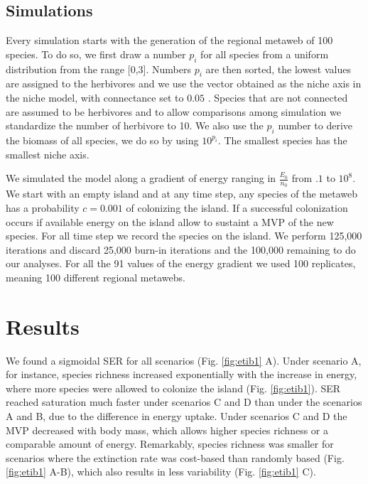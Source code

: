 \subsection{Simulations}\label{simulations}

Every simulation starts with the generation of the regional metaweb of
100 species. To do so, we first draw a number \(p_i\) for all species
from a uniform distribution from the range {[}0,3{]}. Numbers \(p_i\)
are then sorted, the lowest values are assigned to the herbivores and we
use the vector obtained as the niche axis in the niche model, with
connectance set to \(0.05\) \citep{Williams2000}. Species that are not
connected are assumed to be herbivores and to allow comparisons among
simulation we standardize the number of herbivore to 10. We also use the
\(p_i\) number to derive the biomass of all species, we do so by using
\(10^{p_i}\). The smallest species has the smallest niche axis.

We simulated the model along a gradient of energy ranging in
\(\frac{E_0}{n_0}\) from \(.1\) to \(10^8\). We start with an empty
island and at any time step, any species of the metaweb has a
probability \(c=0.001\) of colonizing the island. If a successful
colonization occurs if available energy on the island allow to sustaint
a MVP of the new species. For all time step we record the species on the
island. We perform 125,000 iterations and discard 25,000 burn-in
iterations and the 100,000 remaining to do our analyses. For all the 91
values of the energy gradient we used 100 replicates, meaning 100
different regional metawebs.

\section{Results}\label{results}

We found a sigmoidal SER for all scenarios (Fig. \ref{fig:etib1} A).
Under scenario A, for instance, species richness increased exponentially
with the increase in energy, where more species were allowed to colonize
the island (Fig. \ref{fig:etib1}). SER reached saturation much faster
under scenarios C and D than under the scenarios A and B, due to the
difference in energy uptake. Under scenarios C and D the MVP decreased
with body mass, which allows higher species richness or a comparable
amount of energy. Remarkably, species richness was smaller for scenarios
where the extinction rate was cost-based than randomly based (Fig.
\ref{fig:etib1} A-B), which also results in less variability (Fig.
\ref{fig:etib1} C).

